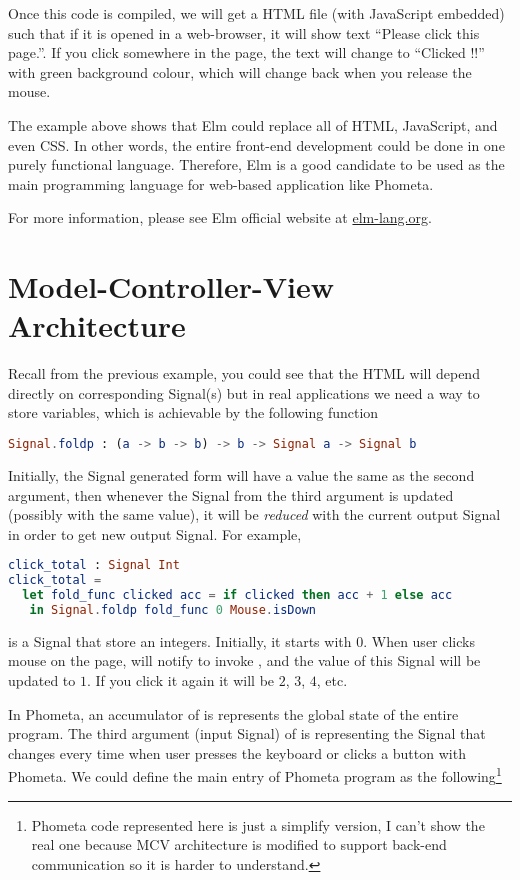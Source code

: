 \documentclass[master.tex]{subfiles}
\begin{document}
Once this code is compiled, we will get a HTML file (with JavaScript embedded)
such that if it is opened in a web-browser, it will show text ``Please click
this page.''. If you click somewhere in the page, the text will change to
``Clicked !!'' with green background colour, which will change back when you
release the mouse.

The example above shows that Elm could replace all of HTML, JavaScript, and even
CSS. In other words, the entire front-end development could be done in one
purely functional language. Therefore, Elm is a good candidate to be used as the
main programming language for web-based application like Phometa.

For more information, please see Elm official website at \url{elm-lang.org}.

\section{Model-Controller-View Architecture}

Recall from the previous example, you could see that the HTML will depend
directly on corresponding Signal(s) but in real applications we need a way to
store variables, which is achievable by the following function

\begin{lstlisting}[language=elm]
Signal.foldp : (a -> b -> b) -> b -> Signal a -> Signal b
\end{lstlisting}

Initially, the Signal generated form  will have a value the
same as the second argument, then whenever the Signal from the third argument is
updated (possibly with the same value), it will be \emph{reduced} with the
current output Signal in order to get new output Signal. For example,

\begin{lstlisting}[language=elm]
click_total : Signal Int
click_total =
  let fold_func clicked acc = if clicked then acc + 1 else acc
   in Signal.foldp fold_func 0 Mouse.isDown
\end{lstlisting}

 is a Signal that store an integers. Initially, it starts
with $0$. When user clicks mouse on the page,  will notify
 to invoke , and the value of this Signal
will be updated to $1$. If you click it again it will be $2$, $3$, $4$, etc.

In Phometa, an accumulator of  is  represents
the global state of the entire program. The third argument (input Signal) of
 is  representing the Signal that changes
every time when user presses the keyboard or clicks a button with Phometa. We
could define the main entry of Phometa program as the following\footnote{Phometa
  code represented here is just a simplify version, I can't show the real one
  because MCV architecture is modified to support back-end communication so it
  is harder to understand.}
\end{document}
